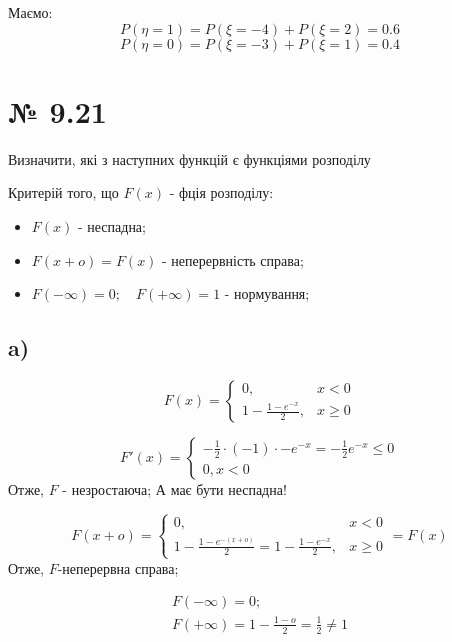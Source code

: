 \documentclass[11pt, a4paper]{article} %
\begin{document}
Маємо:
$$P(\eta = 1) = P(\xi = -4) + P(\xi = 2) = 0.6$$
$$P(\eta = 0) = P(\xi = -3) + P(\xi = 1) = 0.4$$

\section*{№ 9.21}
\begin{mdframed}
    Визначити, які з наступних функцій є функціями розподілу
\end{mdframed}

\begin{mdframed}[backgroundcolor=blue!25]
    Критерій того, що $F(x)$ - фція розподілу:
    \begin{itemize}
        \item $F(x)$ - неспадна;
        \item $F(x+o) = F(x)$ - неперервність справа;
        \item $F(-\infty) = 0;\quad F(+\infty) = 1$ - нормування;
    \end{itemize}
\end{mdframed}

\subsection*{a)}
\begin{mdframed}
    $$F(x) = \begin{cases}
        0,& x<0\\
        1-\frac{1-e^{-x}}{2},& x\ge 0
    \end{cases}$$
\end{mdframed}

$$F'(x) = \begin{cases}
    -\frac{1}{2}\cdot (-1) \cdot - e^{-x} = -\frac{1}{2}e^{-x} \le 0\\
    0, x<0
\end{cases}$$
Отже, $F$ - незростаюча; А має бути неспадна!

$$F(x+o) = \begin{cases}
    0,& x < 0\\
    1-\frac{1-e^{-(x+o)}}{2} = 1-\frac{1-e^{-x}}{2},& x\ge 0
\end{cases} = F(x)$$
Отже, $F$-неперервна справа;

$$\begin{gathered}
    F(-\infty) = 0;\\
    F(+\infty) = 1 - \frac{1 - o}{2} = \frac{1}{2} \ne 1
\end{gathered}$$
\end{document}
